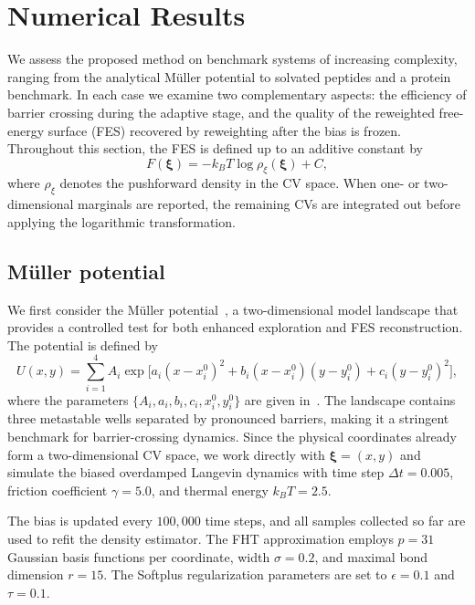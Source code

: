 \documentclass[a4paper,fleqn]{cas-sc}
\theoremstyle{definition}
\begin{document}
\section{Numerical Results}\label{sec:result}
We assess the proposed method on benchmark systems of increasing complexity, ranging from the analytical M\"uller potential to solvated peptides and a protein benchmark. In each case we examine two complementary aspects: the efficiency of barrier crossing during the adaptive stage, and the quality of the reweighted free-energy surface (FES) recovered by reweighting after the bias is frozen. Throughout this section, the FES is defined up to an additive constant by
\begin{equation}
    F(\boldsymbol{\xi}) = -k_B T \log \rho_{\xi}(\boldsymbol{\xi}) + C,
\end{equation}
where $\rho_{\xi}$ denotes the pushforward density in the CV space. When one- or two-dimensional marginals are reported, the remaining CVs are integrated out before applying the logarithmic transformation.

\subsection{M\"uller potential}
\label{subsec:muller}

We first consider the M\"uller potential~\cite{muller1979location}, a two-dimensional model landscape that provides a controlled test for both enhanced exploration and FES reconstruction. The potential is defined by
\begin{equation}
    U(x, y) = \sum_{i=1}^{4} A_i \exp\!\Big[ a_i (x - x_i^0)^2 + b_i (x - x_i^0)(y - y_i^0) + c_i (y - y_i^0)^2 \Big],
    \label{eq:muller}
\end{equation}
where the parameters $\{A_i, a_i, b_i, c_i, x_i^0, y_i^0\}$ are given in~\cite{muller1979location}. The landscape contains three metastable wells separated by pronounced barriers, making it a stringent benchmark for barrier-crossing dynamics. Since the physical coordinates already form a two-dimensional CV space, we work directly with $\boldsymbol{\xi}=(x,y)$ and simulate the biased overdamped Langevin dynamics with time step $\Delta t = 0.005$, friction coefficient $\gamma = 5.0$, and thermal energy $k_B T = 2.5$.

The bias is updated every $100{,}000$ time steps, and all samples collected so far are used to refit the density estimator. The FHT approximation employs $p = 31$ Gaussian basis functions per coordinate, width $\sigma = 0.2$, and maximal bond dimension $r = 15$. The Softplus regularization parameters are set to $\epsilon = 0.1$ and $\tau = 0.1$.
\end{document}
